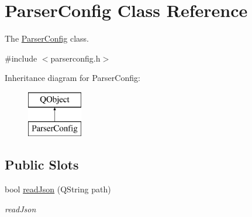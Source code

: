 \hypertarget{class_parser_config}{}\section{Parser\+Config Class Reference}
\label{class_parser_config}


The \hyperlink{class_parser_config}{Parser\+Config} class.  




{\ttfamily \#include $<$parserconfig.\+h$>$}

Inheritance diagram for Parser\+Config\+:\begin{figure}[H]
\begin{center}
\leavevmode
\includegraphics[height=2.000000cm]{class_parser_config}
\end{center}
\end{figure}
\subsection*{Public Slots}
\begin{DoxyCompactItemize}
\item 
bool \hyperlink{class_parser_config_af0029e03ae57af23c7f85393635ecb56}{read\+Json} (Q\+String path)
\begin{DoxyCompactList}\small\item\em read\+Json \end{DoxyCompactList}\end{DoxyCompactItemize}
